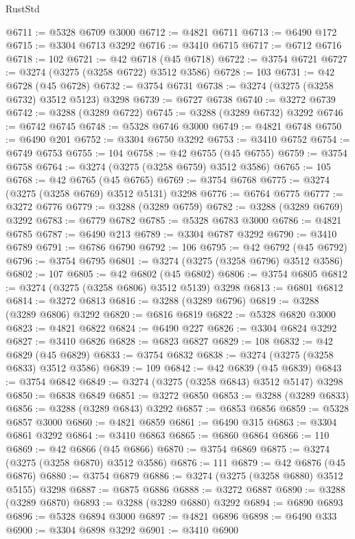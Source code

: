 \begin{lexlean}{RustStd}
\begin{coremodule}
@6711 := @5328 @6709 @3000
@6712 := @4821 @6711
@6713 := @6490 @172
@6715 := @3304 @6713 @3292
@6716 := @3410 @6715
@6717 := @6712 @6716
@6718 := 102
@6721 := @42 @6718 (@45 @6718)
@6722 := @3754 @6721
@6727 := @3274 (@3275 (@3258 @6722) @3512 @3586)
@6728 := 103
@6731 := @42 @6728 (@45 @6728)
@6732 := @3754 @6731
@6738 := @3274 (@3275 (@3258 @6732) @3512 @5123) @3298
@6739 := @6727 @6738
@6740 := @3272 @6739
@6742 := @3288 (@3289 @6722)
@6745 := @3288 (@3289 @6732) @3292
@6746 := @6742 @6745
@6748 := @5328 @6746 @3000
@6749 := @4821 @6748
@6750 := @6490 @201
@6752 := @3304 @6750 @3292
@6753 := @3410 @6752
@6754 := @6749 @6753
@6755 := 104
@6758 := @42 @6755 (@45 @6755)
@6759 := @3754 @6758
@6764 := @3274 (@3275 (@3258 @6759) @3512 @3586)
@6765 := 105
@6768 := @42 @6765 (@45 @6765)
@6769 := @3754 @6768
@6775 := @3274 (@3275 (@3258 @6769) @3512 @5131) @3298
@6776 := @6764 @6775
@6777 := @3272 @6776
@6779 := @3288 (@3289 @6759)
@6782 := @3288 (@3289 @6769) @3292
@6783 := @6779 @6782
@6785 := @5328 @6783 @3000
@6786 := @4821 @6785
@6787 := @6490 @213
@6789 := @3304 @6787 @3292
@6790 := @3410 @6789
@6791 := @6786 @6790
@6792 := 106
@6795 := @42 @6792 (@45 @6792)
@6796 := @3754 @6795
@6801 := @3274 (@3275 (@3258 @6796) @3512 @3586)
@6802 := 107
@6805 := @42 @6802 (@45 @6802)
@6806 := @3754 @6805
@6812 := @3274 (@3275 (@3258 @6806) @3512 @5139) @3298
@6813 := @6801 @6812
@6814 := @3272 @6813
@6816 := @3288 (@3289 @6796)
@6819 := @3288 (@3289 @6806) @3292
@6820 := @6816 @6819
@6822 := @5328 @6820 @3000
@6823 := @4821 @6822
@6824 := @6490 @227
@6826 := @3304 @6824 @3292
@6827 := @3410 @6826
@6828 := @6823 @6827
@6829 := 108
@6832 := @42 @6829 (@45 @6829)
@6833 := @3754 @6832
@6838 := @3274 (@3275 (@3258 @6833) @3512 @3586)
@6839 := 109
@6842 := @42 @6839 (@45 @6839)
@6843 := @3754 @6842
@6849 := @3274 (@3275 (@3258 @6843) @3512 @5147) @3298
@6850 := @6838 @6849
@6851 := @3272 @6850
@6853 := @3288 (@3289 @6833)
@6856 := @3288 (@3289 @6843) @3292
@6857 := @6853 @6856
@6859 := @5328 @6857 @3000
@6860 := @4821 @6859
@6861 := @6490 @315
@6863 := @3304 @6861 @3292
@6864 := @3410 @6863
@6865 := @6860 @6864
@6866 := 110
@6869 := @42 @6866 (@45 @6866)
@6870 := @3754 @6869
@6875 := @3274 (@3275 (@3258 @6870) @3512 @3586)
@6876 := 111
@6879 := @42 @6876 (@45 @6876)
@6880 := @3754 @6879
@6886 := @3274 (@3275 (@3258 @6880) @3512 @5155) @3298
@6887 := @6875 @6886
@6888 := @3272 @6887
@6890 := @3288 (@3289 @6870)
@6893 := @3288 (@3289 @6880) @3292
@6894 := @6890 @6893
@6896 := @5328 @6894 @3000
@6897 := @4821 @6896
@6898 := @6490 @333
@6900 := @3304 @6898 @3292
@6901 := @3410 @6900

\end{coremodule}
\end{lexlean}
